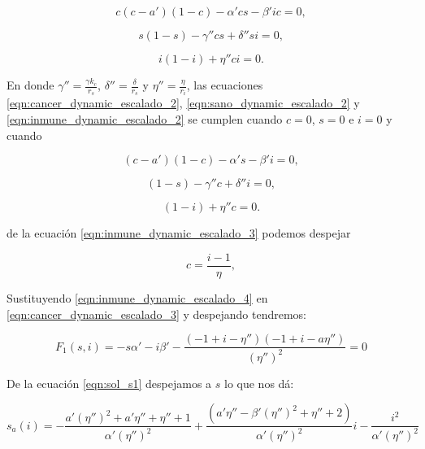 \documentclass{article}
\begin{document}
\begin{equation}
    c (c - a')(1-c) - \alpha' cs - \beta' i c = 0,
    \label{eqn:cancer_dynamic_escalado_2}
\end{equation}

\begin{equation}
     s (1 - s)  - \gamma'' cs + \delta'' si = 0,
    \label{eqn:sano_dynamic_escalado_2}
\end{equation}


\begin{equation}
    i(1-i) + \eta'' ci = 0.
    \label{eqn:inmune_dynamic_escalado_2}
\end{equation}

En donde $\gamma'' = \frac{\gamma k_c}{r_s}$,  $\delta'' = \frac{\delta}{r_s}$ y $\eta'' = \frac{\eta}{r_i}$,  las ecuaciones \ref{eqn:cancer_dynamic_escalado_2}, \ref{eqn:sano_dynamic_escalado_2} y \ref{eqn:inmune_dynamic_escalado_2} se cumplen cuando $c=0$, $s=0$ e $i=0$ y cuando 

\begin{equation}
    (c - a')(1-c) - \alpha' s - \beta' i  = 0,
    \label{eqn:cancer_dynamic_escalado_3}
\end{equation}

\begin{equation}
    (1 - s)  - \gamma'' c + \delta'' i = 0,
    \label{eqn:sano_dynamic_escalado_3}
\end{equation}


\begin{equation}
    (1-i) + \eta'' c = 0.
    \label{eqn:inmune_dynamic_escalado_3}
\end{equation}

de la ecuación  \ref{eqn:inmune_dynamic_escalado_3} podemos despejar

\begin{equation}
    c =  \frac{ i-1}{\eta},
    \label{eqn:inmune_dynamic_escalado_4}
\end{equation}

Sustituyendo \ref{eqn:inmune_dynamic_escalado_4} en \ref{eqn:cancer_dynamic_escalado_3} y despejando tendremos:

\begin{equation}
 F_1 (s,i) = -s \alpha' - i\beta' - \frac{(-1+i-\eta'')(-1+i -a \eta'')}{(\eta'')^2}  = 0
    \label{eqn:sol_s1}
\end{equation}


De la ecuación \ref{eqn:sol_s1} despejamos a $s$ lo que nos dá:

\begin{equation}
    s_a(i) = -\frac{a' (\eta'') ^2+a' \eta'' +\eta'' +1}{\alpha'  (\eta'') ^2}+\frac{ \left(a' \eta'' -\beta'  (\eta'') ^2+\eta''
   +2\right)}{\alpha'  (\eta'') ^2}i-\frac{i^2}{\alpha'  (\eta'') ^2}
   \label{eqn:sol_s11}
\end{equation}
\end{document}
